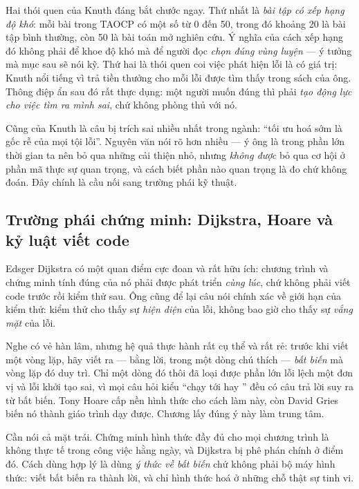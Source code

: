 \documentclass[../../algorithm.tex]{subfiles}
\begin{document}
Hai thói quen của Knuth đáng bắt chước ngay. Thứ nhất là \emph{bài tập có xếp hạng độ khó}: mỗi bài trong TAOCP có một số từ 0 đến 50, trong đó khoảng 20 là bài tập bình thường, còn 50 là bài toán mở nghiên cứu. Ý nghĩa của cách xếp hạng đó không phải để khoe độ khó mà để người đọc \emph{chọn đúng vùng luyện} --- ý tưởng mà mục sau sẽ nói kỹ. Thứ hai là thói quen coi việc phát hiện lỗi là có giá trị: Knuth nổi tiếng vì trả tiền thưởng cho mỗi lỗi được tìm thấy trong sách của ông. Thông điệp ẩn sau đó rất thực dụng: một người muốn đúng thì phải \emph{tạo động lực cho việc tìm ra mình sai}, chứ không phòng thủ với nó.

Cũng của Knuth là câu bị trích sai nhiều nhất trong ngành: ``tối ưu hoá sớm là gốc rễ của mọi tội lỗi''\cite{knuth1974goto}. Nguyên văn nói rõ hơn nhiều --- ý ông là trong phần lớn thời gian ta nên bỏ qua những cải thiện nhỏ, nhưng \emph{không được} bỏ qua cơ hội ở phần mã thực sự quan trọng, và cách biết phần nào quan trọng là đo chứ không đoán. Đây chính là cầu nối sang trường phái kỹ thuật.

\subsection{Trường phái chứng minh: Dijkstra, Hoare và kỷ luật viết code}

Edsger Dijkstra có một quan điểm cực đoan và rất hữu ích: chương trình và chứng minh tính đúng của nó phải được phát triển \emph{cùng lúc}, chứ không phải viết code trước rồi kiểm thử sau\cite{dijkstra1976}. Ông cũng để lại câu nói chính xác về giới hạn của kiểm thử: kiểm thử cho thấy sự \emph{hiện diện} của lỗi, không bao giờ cho thấy sự \emph{vắng mặt} của lỗi.

Nghe có vẻ hàn lâm, nhưng hệ quả thực hành rất cụ thể và rất rẻ: trước khi viết một vòng lặp, hãy viết ra --- bằng lời, trong một dòng chú thích --- \emph{bất biến} mà vòng lặp đó duy trì. Chỉ một dòng đó thôi đã loại được phần lớn lỗi lệch một đơn vị và lỗi khởi tạo sai, vì mọi câu hỏi kiểu ``chạy tới  hay '' đều có câu trả lời suy ra từ bất biến. Tony Hoare cấp nền hình thức cho cách làm này\cite{hoare1969}, còn David Gries biến nó thành giáo trình dạy được\cite{gries1981}. Chương  lấy đúng ý này làm trung tâm.

Cần nói cả mặt trái. Chứng minh hình thức đầy đủ cho mọi chương trình là không thực tế trong công việc hằng ngày, và Dijkstra bị phê phán chính ở điểm đó. Cách dùng hợp lý là dùng \emph{ý thức về bất biến} chứ không phải bộ máy hình thức: viết bất biến ra thành lời, và chỉ hình thức hoá ở những chỗ thật sự tinh vi.
\end{document}
